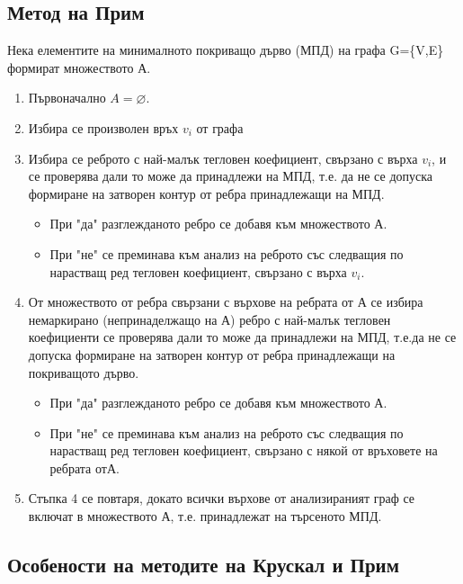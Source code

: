 \documentclass[fleqn, 12pt]{article}
\theoremstyle{definition}
\begin{document}
\subsection{Метод на Прим}
Нека елементите на минималното покриващо дърво (МПД) на графа G=\{V,E\} формират множеството А.
\begin{enumerate}
\item Първоначално $A = \varnothing$.
\item Избира се произволен връх $v_i$ от графа
\item Избира се реброто с най-малък тегловен коефициент, свързано с върха $v_i$, и се проверява дали то може да принадлежи на МПД, т.е. да не се допуска формиране на затворен контур от ребра принадлежащи на МПД.
\begin{itemize}
\item При "да" разглежданото ребро се добавя към множеството А.
\item При "не" се преминава към анализ на реброто със следващия по нарастващ ред тегловен коефициент, свързано с върха $v_i$.
\end{itemize}
\item От  множеството от ребра свързани с върхове на ребрата от А се избира немаркирано (непринаделжащо на А) ребро  с най-малък тегловен коефициенти се проверява дали то може да принадлежи на МПД, т.е.да не се допуска формиране на затворен контур от ребра  принадлежащи на покриващото дърво.
\begin{itemize}
\item При "да" разглежданото ребро се добавя към множеството А.
\item При "не" се преминава към анализ на реброто със следващия по нарастващ ред тегловен коефициент, свързано с някой  от връховете на ребрата отА.
\end{itemize}
\item Стъпка 4 се повтаря, докато всички върхове от анализираният граф се включат в множеството А, т.е. принадлежат на търсеното МПД.
\end{enumerate}
\subsection{Особености на методите на Крускал и Прим}
\end{document}
